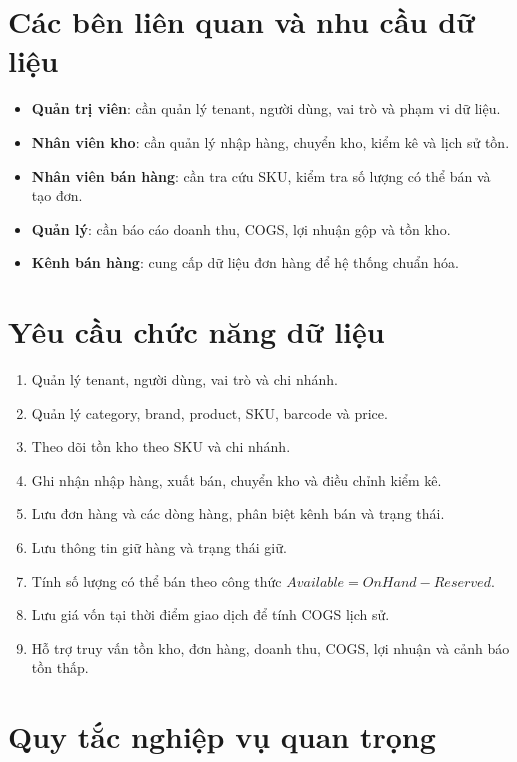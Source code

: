 \section{Các bên liên quan và nhu cầu dữ liệu}

\begin{itemize}
    \item \textbf{Quản trị viên}: cần quản lý tenant, người dùng, vai trò và phạm vi dữ liệu.
    \item \textbf{Nhân viên kho}: cần quản lý nhập hàng, chuyển kho, kiểm kê và lịch sử tồn.
    \item \textbf{Nhân viên bán hàng}: cần tra cứu SKU, kiểm tra số lượng có thể bán và tạo đơn.
    \item \textbf{Quản lý}: cần báo cáo doanh thu, COGS, lợi nhuận gộp và tồn kho.
    \item \textbf{Kênh bán hàng}: cung cấp dữ liệu đơn hàng để hệ thống chuẩn hóa.
\end{itemize}

\section{Yêu cầu chức năng dữ liệu}

\begin{enumerate}
    \item Quản lý tenant, người dùng, vai trò và chi nhánh.
    \item Quản lý category, brand, product, SKU, barcode và price.
    \item Theo dõi tồn kho theo SKU và chi nhánh.
    \item Ghi nhận nhập hàng, xuất bán, chuyển kho và điều chỉnh kiểm kê.
    \item Lưu đơn hàng và các dòng hàng, phân biệt kênh bán và trạng thái.
    \item Lưu thông tin giữ hàng và trạng thái giữ.
    \item Tính số lượng có thể bán theo công thức $Available = OnHand - Reserved$.
    \item Lưu giá vốn tại thời điểm giao dịch để tính COGS lịch sử.
    \item Hỗ trợ truy vấn tồn kho, đơn hàng, doanh thu, COGS, lợi nhuận và cảnh báo tồn thấp.
\end{enumerate}

\section{Quy tắc nghiệp vụ quan trọng}

